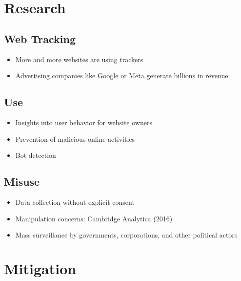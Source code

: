 \documentclass[12pt]{article}
\begin{document}
\section*{Research}

\subsection*{Web Tracking}
\begin{itemize}
  \item More and more websites are using trackers \cite{lernerInternetJonesRaiders2016}
  \item Advertising companies like Google or Meta generate billions in revenue \cite{DigitalAdvertisingRevenue}
\end{itemize}

\subsection*{Use}
\begin{itemize}
  \item Insights into user behavior for website owners \cite{nambiarWebsiteTrackingHow2024}
  \item Prevention of malicious online activities \cite{teamHowIPLocation2023}
  \item Bot detection \cite{teamBotDetectionPrevent}
\end{itemize}

\subsection*{Misuse}
\begin{itemize}
  \item Data collection without explicit consent \cites{simCombatingWebTracking2024}{sarContextualIntegritysDecision2014}{sanchez-rolaWebWatchingYou2017}
  \item Manipulation concerns: Cambridge Analytica (2016) \cite{twetmanDataBrokersSecurity2021}
  \item Mass surveillance by governments, corporations, and other political actors \cite{meineckGigantischesDatenLeakDroht2025}
\end{itemize}

\section*{Mitigation}
\end{document}
